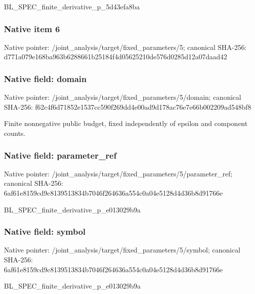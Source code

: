\documentclass[10pt,a4paper]{article}
\begin{document}
\begingroup\raggedright\sloppy BL\_\allowbreak{}SPEC\_\allowbreak{}finite\_\allowbreak{}derivative\_\allowbreak{}p\_\allowbreak{}5d43efa8ba\par\endgroup

\subsubsection{Native item 6}
Native pointer: /joint\_\allowbreak{}analysis/target/fixed\_\allowbreak{}parameters/5; canonical SHA-256: d771a079e168ba963b6288661b25184f4d05625210de576d0285d12a07daad42

\subsubsection{Native field: domain}
Native pointer: /joint\_\allowbreak{}analysis/target/fixed\_\allowbreak{}parameters/5/domain; canonical SHA-256: f62c4f6d71852e1537cc590f269dd4e00ad9d178ac76e7e66b002209ad548bf8

\begingroup\raggedright\sloppy Finite nonnegative public budget,\allowbreak{} fixed independently of epsilon and component counts.\par\endgroup

\subsubsection{Native field: parameter\_\allowbreak{}ref}
Native pointer: /joint\_\allowbreak{}analysis/target/fixed\_\allowbreak{}parameters/5/parameter\_\allowbreak{}ref; canonical SHA-256: 6af61e8159cd9c8139513834b7046f264636a554c0a04e5128d4d36b8d91766e

\begingroup\raggedright\sloppy BL\_\allowbreak{}SPEC\_\allowbreak{}finite\_\allowbreak{}derivative\_\allowbreak{}p\_\allowbreak{}e013029b9a\par\endgroup

\subsubsection{Native field: symbol}
Native pointer: /joint\_\allowbreak{}analysis/target/fixed\_\allowbreak{}parameters/5/symbol; canonical SHA-256: 6af61e8159cd9c8139513834b7046f264636a554c0a04e5128d4d36b8d91766e

\begingroup\raggedright\sloppy BL\_\allowbreak{}SPEC\_\allowbreak{}finite\_\allowbreak{}derivative\_\allowbreak{}p\_\allowbreak{}e013029b9a\par\endgroup
\end{document}
